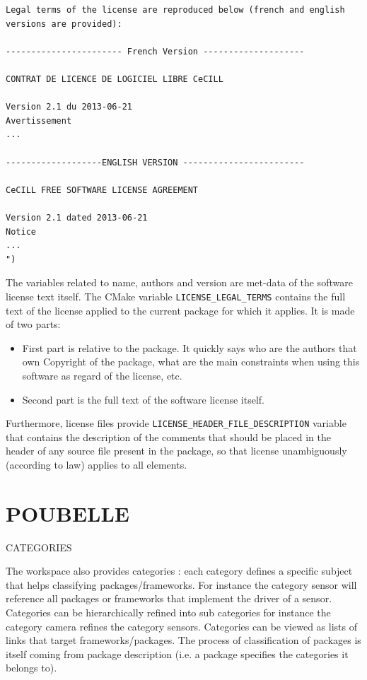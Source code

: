 \documentclass[12pt,a4paper]{article}
\begin{document}
\begin{verbatim}
Legal terms of the license are reproduced below (french and english versions are provided):

----------------------- French Version --------------------

CONTRAT DE LICENCE DE LOGICIEL LIBRE CeCILL

Version 2.1 du 2013-06-21
Avertissement
...

-------------------ENGLISH VERSION ------------------------

CeCILL FREE SOFTWARE LICENSE AGREEMENT

Version 2.1 dated 2013-06-21
Notice
...
")
\end{verbatim}

The variables related to name, authors and version are met-data of the software license text itself. The CMake variable \texttt{LICENSE\_LEGAL\_TERMS} contains the full text of the license applied to the current package for which it applies. It is made of two parts:
\begin{itemize}
\item First part is relative to the package. It quickly says who are the authors that own Copyright of the package, what are the main constraints when using this software as regard of the license, etc.
\item Second part is the full text of the software license itself. 
\end{itemize}

Furthermore, license files provide \texttt{LICENSE\_HEADER\_FILE\_DESCRIPTION} variable that contains the description of the comments that should be placed in the header of any source file present in the package, so that license unambiguously (according to law) applies to all elements.

\pagebreak

\part*{POUBELLE}


CATEGORIES

 The workspace also provides categories : each category defines a specific subject that helps classifying packages/frameworks. For instance the category sensor will reference all packages or frameworks that implement the driver of a sensor. Categories can be hierarchically refined into sub categories for instance the category camera refines the category sensors. Categories can be viewed as lists of links that target frameworks/packages. The process of classification of packages is itself coming from package description (i.e. a package specifies the categories it belongs to).
 
\end{document}
